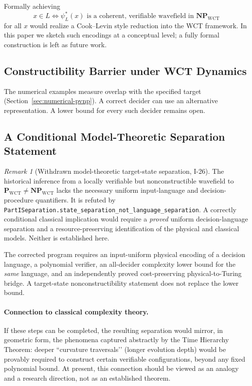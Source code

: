 \documentclass[12pt]{article}
\theoremstyle{remark}
\newtheorem*{remark}{Remark}
\begin{document}
Formally achieving
\[
x \in L \iff \psi^*_L(x) \text{ is a coherent, verifiable wavefield in } \mathbf{NP}_{\mathrm{WCT}}
\]
for all \(x\) would realize a Cook–Levin style reduction into the WCT framework. In this paper we sketch such encodings at a conceptual level; a fully formal construction is left as future work.

\subsection{Constructibility Barrier under WCT Dynamics}

The numerical examples measure overlap with the specified target
(Section~\ref{sec:numerical-pvnp}). A correct decider can use an
alternative representation. A lower bound for every such decider remains open.

\subsection{A Conditional Model-Theoretic Separation Statement}

\begin{remark}[Withdrawn model-theoretic target-state separation, I-26]
The historical inference from a locally verifiable but
nonconstructible wavefield to
$\mathbf P_{\mathrm{WCT}}\ne\mathbf{NP}_{\mathrm{WCT}}$
lacks the necessary uniform input-language and
decision-procedure quantifiers.  It is refuted by
\nolinkurl{PartISeparation.state_separation_not_language_separation}.
A correctly conditional classical implication would require
a \emph{proved} uniform decision-language separation and
a resource-preserving identification of the physical and
classical models.  Neither is established here.
\end{remark}

The corrected program requires an input-uniform
physical encoding of a decision language, a polynomial
verifier, an all-decider complexity lower bound for the
\emph{same} language, and an independently proved
cost-preserving physical-to-Turing bridge.  A target-state
nonconstructibility statement does not replace the lower bound.

\paragraph{Connection to classical complexity theory.}
If these steps can be completed, the resulting separation would mirror, in geometric form, the phenomena captured abstractly by the Time Hierarchy Theorem: deeper “curvature traversals’’ (longer evolution depth) would be provably required to construct certain verifiable configurations, beyond any fixed polynomial bound. At present, this connection should be viewed as an analogy and a research direction, not as an established theorem.
\end{document}
